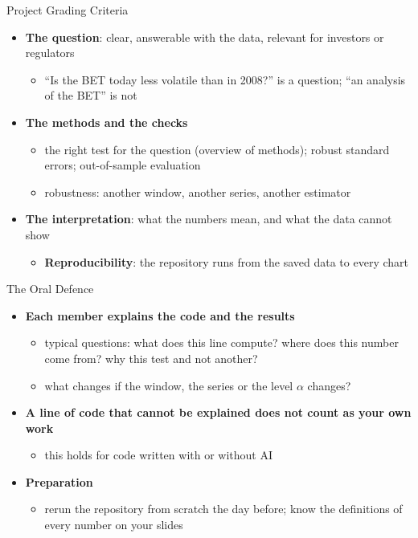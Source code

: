 \begin{frame}{Project Grading Criteria}
\itemsize{\small}
\begin{itemize}
    \item \textbf{The question}: clear, answerable with the data, relevant for investors or regulators
    \begin{itemize}
        \item ``Is the BET today less volatile than in 2008?'' is a question; ``an analysis of the BET'' is not
    \end{itemize}
    \item \textbf{The methods and the checks}
    \begin{itemize}
        \item the right test for the question (overview of methods); robust standard errors; out-of-sample evaluation
        \item robustness: another window, another series, another estimator
    \end{itemize}
    \item \textbf{The interpretation}: what the numbers mean, and what the data cannot show
    \begin{itemize}
        \item \textbf{Reproducibility}: the repository runs from the saved data to every chart
    \end{itemize}
\end{itemize}
\end{frame}

\begin{frame}{The Oral Defence}
\itemsize{\small}
\begin{itemize}
    \item \textbf{Each member explains the code and the results}
    \begin{itemize}
        \item typical questions: what does this line compute? where does this number come from? why this test and not another?
        \item what changes if the window, the series or the level $\alpha$ changes?
    \end{itemize}
    \item \textbf{A line of code that cannot be explained does not count as your own work}
    \begin{itemize}
        \item this holds for code written with or without AI
    \end{itemize}
    \item \textbf{Preparation}
    \begin{itemize}
        \item rerun the repository from scratch the day before; know the definitions of every number on your slides
    \end{itemize}
\end{itemize}
\end{frame}

